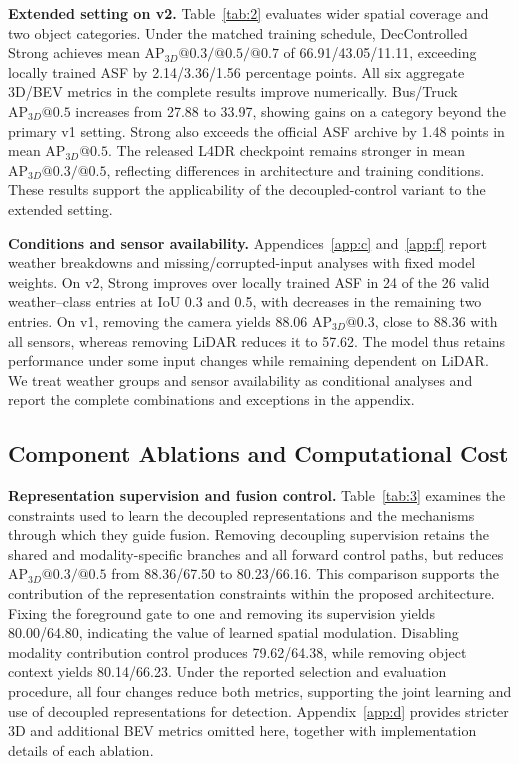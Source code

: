 \textbf{Extended setting on v2.} Table~\ref{tab:2} evaluates wider spatial coverage and two object categories. Under the matched training schedule, DecControlled Strong achieves mean \(\mathrm{AP}_{3D}@0.3/@0.5/@0.7\) of 66.91/43.05/11.11, exceeding locally trained ASF by 2.14/3.36/1.56 percentage points. All six aggregate 3D/BEV metrics in the complete results improve numerically. Bus/Truck \(\mathrm{AP}_{3D}@0.5\) increases from 27.88 to 33.97, showing gains on a category beyond the primary v1 setting. Strong also exceeds the official ASF archive by 1.48 points in mean \(\mathrm{AP}_{3D}@0.5\). The released L4DR checkpoint remains stronger in mean \(\mathrm{AP}_{3D}@0.3/@0.5\), reflecting differences in architecture and training conditions. These results support the applicability of the decoupled-control variant to the extended setting.

\textbf{Conditions and sensor availability.} Appendices~\ref{app:c} and~\ref{app:f} report weather breakdowns and missing/corrupted-input analyses with fixed model weights. On v2, Strong improves over locally trained ASF in 24 of the 26 valid weather--class entries at IoU 0.3 and 0.5, with decreases in the remaining two entries. On v1, removing the camera yields 88.06 \(\mathrm{AP}_{3D}@0.3\), close to 88.36 with all sensors, whereas removing LiDAR reduces it to 57.62. The model thus retains performance under some input changes while remaining dependent on LiDAR. We treat weather groups and sensor availability as conditional analyses and report the complete combinations and exceptions in the appendix.

\subsection{Component Ablations and Computational Cost}
\label{subsec:43}

\textbf{Representation supervision and fusion control.} Table~\ref{tab:3} examines the constraints used to learn the decoupled representations and the mechanisms through which they guide fusion. Removing decoupling supervision retains the shared and modality-specific branches and all forward control paths, but reduces \(\mathrm{AP}_{3D}@0.3/@0.5\) from 88.36/67.50 to 80.23/66.16. This comparison supports the contribution of the representation constraints within the proposed architecture. Fixing the foreground gate to one and removing its supervision yields 80.00/64.80, indicating the value of learned spatial modulation. Disabling modality contribution control produces 79.62/64.38, while removing object context yields 80.14/66.23. Under the reported selection and evaluation procedure, all four changes reduce both metrics, supporting the joint learning and use of decoupled representations for detection. Appendix~\ref{app:d} provides stricter 3D and additional BEV metrics omitted here, together with implementation details of each ablation.

